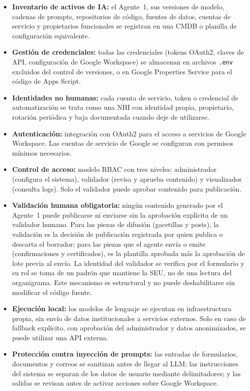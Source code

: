 \documentclass[a4paper, 12pt]{article}
\begin{document}
\begin{itemize}
  \item \textbf{Inventario de activos de IA:} el Agente~1, sus versiones de modelo, cadenas de prompts, repositorios de c\'odigo, fuentes de datos, cuentas de servicio y propietarios funcionales se registran en una \ac{CMDB} o planilla de configuraci\'on equivalente.
  \item \textbf{Gesti\'on de credenciales:} todas las credenciales (tokens OAuth2, claves de API, configuraci\'on de Google Workspace) se almacenan en archivos \texttt{.env} excluidos del control de versiones, o en Google Properties Service para el c\'odigo de Apps Script.
  \item \textbf{Identidades no humanas:} cada cuenta de servicio, token o credencial de automatizaci\'on se trata como una \ac{NHI} con identidad propia, propietario, rotaci\'on peri\'odica y baja documentada cuando deje de utilizarse.
  \item \textbf{Autenticaci\'on:} integraci\'on con OAuth2 para el acceso a servicios de Google Workspace. Las cuentas de servicio de Google se configuran con permisos m\'inimos necesarios.
  \item \textbf{Control de acceso:} modelo \ac{RBAC} con tres niveles: administrador (configura el sistema), validador (revisa y aprueba contenido) y visualizador (consulta logs). Solo el validador puede aprobar contenido para publicaci\'on.
  \item \textbf{Validaci\'on humana obligatoria:} ning\'un contenido generado por el Agente~1 puede publicarse ni enviarse sin la aprobaci\'on expl\'icita de un validador humano. Para las piezas de difusi\'on (gacetillas y posts), la validaci\'on es la decisi\'on de publicaci\'on registrada por quien publica o descarta el borrador; para las piezas que el agente env\'ia o emite (confirmaciones y certificados), es la plantilla aprobada m\'as la aprobaci\'on de lote previa al env\'io. La identidad del validador se verifica por el formulario y su rol se toma de un padr\'on que mantiene la \ac{SEU}, no de una lectura del organigrama. Este mecanismo es estructural y no puede deshabilitarse sin modificar el c\'odigo fuente.
  \item \textbf{Ejecuci\'on local:} los modelos de lenguaje se ejecutan en infraestructura propia, sin env\'io de datos institucionales a servicios externos. Solo en caso de fallback expl\'icito, con aprobaci\'on del administrador y datos anonimizados, se puede utilizar una API externa.
  \item \textbf{Protecci\'on contra inyecci\'on de prompts:} las entradas de formularios, documentos y correos se sanitizan antes de llegar al \ac{LLM}; las instrucciones del sistema se separan de los datos de usuario mediante delimitadores; y las salidas se revisan antes de activar acciones sobre Google Workspace.

\end{itemize}
\end{document}
